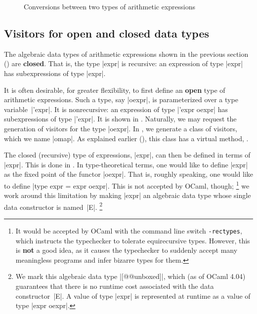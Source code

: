 \documentclass[11pt,a4paper,twoside]{article}
\renewcommand{\emph}[1]{\textbf{#1}}
\begin{document}
\begin{figure}[p]
\caption{Conversions between two types of arithmetic expressions}
\label{fig:expr14}
\end{figure}

\subsection{Visitors for open and closed data types}

The algebraic data types of arithmetic expressions shown in the previous
section () are \emph{closed}. That is, the type \oc|expr|
is recursive: an expression of type \oc|expr| has subexpressions of type
\oc|expr|.

It is often desirable, for greater flexibility, to first define an \emph{open}
type of arithmetic expressions. Such a type, say \oc|oexpr|, is parameterized
over a type variable~\oc|'expr|. It is nonrecursive: an expression of type
\oc|'expr oexpr| has subexpressions of type \oc|'expr|. It is shown in
. Naturally, we may request the generation of visitors for
the type \oc|oexpr|. In , we generate a class of \map
visitors, which we name \oc|omap|. As explained earlier
(), this class has a virtual method,
.

The closed (recursive) type of expressions, \oc|expr|, can then be defined in
terms of \oc|expr|. This is done in . In type-theoretical
terms, one would like to define \oc|expr| as the fixed point of the functor
\oc|oexpr|.
That is, roughly speaking, one would like to define \oc|type expr = expr oexpr|.
This is not accepted by OCaml, though;%
%
\footnote{It would be accepted by OCaml with the command line switch
  \texttt{-rectypes}, which instructs the typechecker to tolerate
  equirecursive types. However, this is \emph{not} a good idea, as it causes
  the typechecker to suddenly accept many meaningless programs and infer
  bizarre types for them.}
%
we work around this limitation by making \oc|expr| an algebraic data type
whose single data constructor is named~\oc|E|.%
%
\footnote{We mark this algebraic data type \oc|[@@unboxed]|, which (as of
  OCaml 4.04) guarantees that there is no runtime cost associated with the
  data constructor~\oc|E|. A value of type \oc|expr| is represented at
  runtime as a value of type \oc|expr oexpr|.}
\end{document}
